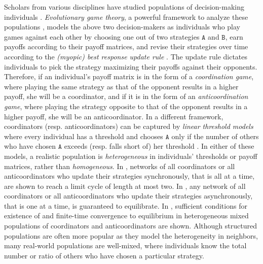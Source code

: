\documentclass[10 pt,twocolumn,journal]{IEEEtran}
\theoremstyle{plain}
\newcommand{\A}{\mathcal{A}}
\renewcommand{\A}{\mathtt{A}}
\newcommand{\B}{\mathtt{B}}
\theoremstyle{definition}
\begin{document}
Scholars from various disciplines have studied populations of decision-making individuals \cite{barabasi1999,schlag1998,barreiro2018constrained,cheng2014finite,lee2008,funk2009}. %
\emph{Evolutionary game theory}, a powerful framework to analyze these populations  \cite{nowak2006,govaert2020zero,zhu2016evolutionary,como2020imitation,zhao2016matrix}, models the above two decision-makers as individuals who play games against each other by choosing one out of two strategies $\A$ and $\B$, earn payoffs according to their payoff matrices, and revise their strategies over time according to the \textit{(myopic) best response update rule} \cite{bopardikar2017convergence,ghaderi2014opinion,ramazi2015,le2020heterogeneous}.
The update rule dictates individuals to pick the strategy maximizing their payoffs against their opponents. 
Therefore, if an individual's payoff matrix is in the form of a \emph{coordination game}, where playing the same strategy as that of the opponent results in a higher payoff, she will be a coordinator, and if it is in the form of an \emph{anticoordination game}, where playing the strategy opposite to that of the opponent results in a higher payoff, she will be an anticoordinator.
In a different framework, coordinators (resp. anticoordinators) can be captured by \emph{linear threshold models} where every individual has a threshold and chooses $\A$ only if the number of others who have chosen $\A$ exceeds (resp. falls short of) her threshold \cite{granovetter1978threshold}. 
In either of these models, a realistic population is \emph{heterogeneous} in individuals' thresholds or payoff matrices, rather than \emph{homogeneous}. 
In \cite{adam2012behavior,adam2012threshold}, networks of all coordinators or all anticoordinators who update their strategies synchronously, that is all at a time, are shown to reach a limit cycle of length at most two.
In \cite{Ramazi2016a}, any network of all coordinators or all anticoordinators who update their strategies asynchronously, that is one at a time, is guaranteed to equilibrate.
In \cite{vanelli2020games,arditti2021equilibria}, sufficient conditions for existence of and finite-time convergence to equilibrium in heterogeneous mixed populations of coordinators and anticoordinators are shown.
Although structured populations are often more popular as they model the heterogeneity in neighbors, many real-world populations are well-mixed, where individuals know the total number or ratio of others who have chosen a particular strategy.
\end{document}

